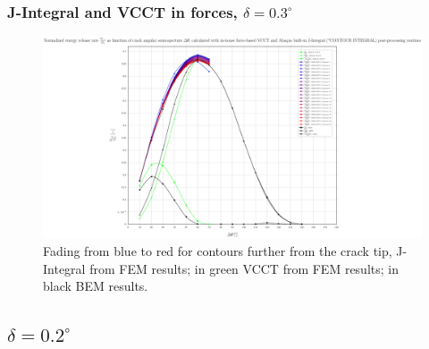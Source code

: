 \documentclass[first,firstsupp,lastsupp,handout,last,hyperref,table]{ETHclass}
\begin{document}
\begin{frame}
\frametitle{\small J-Integral and VCCT in forces, $\delta=0.3^{\circ}$}
\vspace{-0.5cm}
\centering
\captionsetup[figure]{font=scriptsize,labelfont=scriptsize}
\begin{figure}[!h]
\centering
\includegraphics[height=0.7\textheight]{2017-07-10_AbqRunSummary_SmallStrainD03_F-VCCT-JINT_Summary.pdf}
  \caption{\scriptsize Fading from blue to red for contours further from the crack tip, J-Integral from FEM results; in green VCCT from FEM results; in black BEM results.}
  \label{fig:res1}
\end{figure}
\end{frame}



\subsection{$\delta=0.2^{\circ}$}
\end{document}
